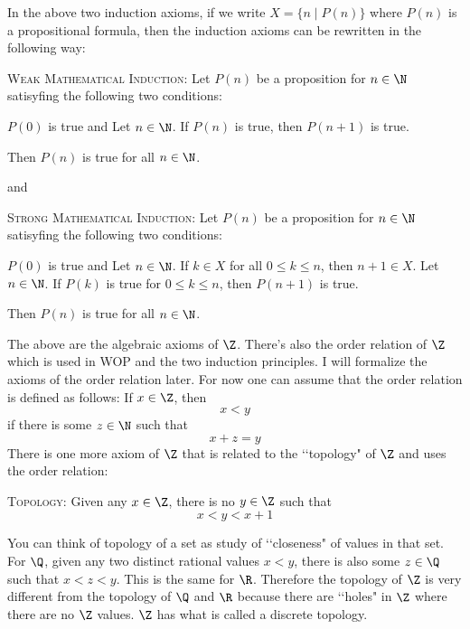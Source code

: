 In the above two induction axioms, if we write $X = \{n \mid P(n)\}$ where
$P(n)$ is a propositional formula,
then the induction axioms can be rewritten in the
following way:

\begin{enumerate}[nosep]
  \li \textsc{Weak Mathematical Induction}:
  Let $P(n)$ be a proposition for $n \in \N$ satisyfing the following two
  conditions:
  \begin{enumerate}[nosep]
    \li $P(0)$ is true and
    \li Let $n \in \N$. If $P(n)$ is true, then $P(n+1)$ is true.
  \end{enumerate}
  Then $P(n)$ is true for all $n \in \N$.
\end{enumerate}
and
\begin{enumerate}[nosep]
  \li \textsc{Strong Mathematical Induction}:
  Let $P(n)$ be a proposition for $n \in \N$ satisyfing the following two
  conditions:
  \begin{enumerate}[nosep]
    \li $P(0)$ is true and
    \li Let $n \in \N$. If $k \in X$ for all $0 \leq k \leq n$,
    then $n + 1 \in X$.
    \li Let $n \in \N$. If $P(k)$ is true for $0 \leq k \leq n$,
    then $P(n+1)$ is true.
  \end{enumerate}
  Then $P(n)$ is true for all $n \in \N$.
\end{enumerate}

The above are the algebraic axioms of $\Z$.
There's also the order relation of $\Z$ which is used in WOP
and the two induction principles.
I will formalize the axioms of the order relation later.
For now one can assume that the order relation is defined as follows:
If $x \in \Z$, then
\[
x < y
\]
if there is some $z \in \N$ such that
\[
x + z = y
\]
There is one more axiom of $\Z$ that is related to the
\lq\lq topology" of $\Z$ and uses the order relation:

\begin{enumerate}[nosep]
  \li \textsc{Topology}:
  Given any $x \in \Z$, there is no $y \in \Z$ such that
  \[
  x < y < x + 1
  \]
\end{enumerate}

You can think of topology of a set as study of \lq\lq closeness" of values
in that set.
For $\Q$, given any two distinct
rational values $x < y$, there is also some $z \in \Q$ such that
$x < z < y$.
This is the same for $\R$.
Therefore the topology of $\Z$ is very different from the topology
of $\Q$ and $\R$ because there are \lq\lq holes" in $\Z$ where
there are no $\Z$ values.
$\Z$ has what is called a discrete topology.

